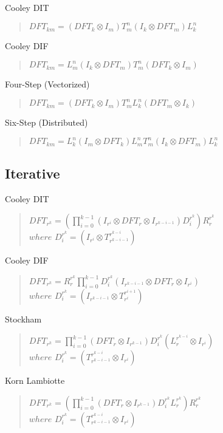 \documentclass[11pt]{article}
\begin{document}
Cooley DIT
\begin{quote}$DFT_{km} = (DFT_{k}\otimes I_{m})T^{n}_m(I_{k}\otimes DFT_{m})L^{n}_k$\end{quote}

Cooley DIF
\begin{quote}$DFT_{km} = L^{n}_m(I_{k}\otimes DFT_{m})T^{n}_m(DFT_{k}\otimes I_{m})$\end{quote}

Four-Step (Vectorized)
\begin{quote}$DFT_{km} = (DFT_{k}\otimes I_{m})T^{n}_mL^{n}_k(DFT_{m}\otimes I_{k})$\end{quote}

Six-Step (Distributed)
\begin{quote}$DFT_{km} = L^{n}_k(I_{m}\otimes DFT_{k})L^{n}_mT^{n}_m(I_{k}\otimes DFT_{m})L^{n}_k$\end{quote}

\subsection*{Iterative}

Cooley DIT
\begin{quote}$DFT_{r^{k}} = \left(\prod\limits^{k-1}_{i=0}(I_{r^{i}}\otimes DFT_r\otimes I_{r^{k-i-1}})D^{r^{k}}_{i}\right)R^{r^{k}}_{r}$\\
	$where$ $D^{r^{k}}_{i} = (I_{r^{i}}\otimes T^{r^{k-i}}_{r^{k-i-1}})$\end{quote}

Cooley DIF
\begin{quote}$DFT_{r^{k}} = R^{r^{k}}_{r}\prod\limits^{k-1}_{i=0}D^{r^{k}}_{i}(I_{r^{k-i-1}}\otimes DFT_r\otimes I_{r^{i}})$\\
	$where$ $D^{r^{k}}_{i} = (I_{r^{k-i-1}}\otimes T_{r^{i}}^{r^{i+1}})$\end{quote}

Stockham
\begin{quote}$DFT_{r^{k}} = \prod\limits^{k-1}_{i=0}(DFT_r\otimes I_{r^{k-1}})D^{r^{k}}_{i}(L^{r^{k-i}}_{r}\otimes I_{r^{i}})$\\
	$where$ $D^{r^{k}}_{i} = (T^{r^{k-i}}_{r^{k-i-1}}\otimes I_{r^{i}})$\end{quote}

Korn Lambiotte
\begin{quote}$DFT_{r^{k}} = \left(\prod\limits^{k-1}_{i=0}(DFT_r\otimes I_{r^{k-1}})D^{r^{k}}_{i}L^{r^{k}}_{r}\right)R^{r^{k}}_{r}$\\
	$where$ $D^{r^{k}}_{i} = (T^{r^{k-i}}_{r^{k-i-1}}\otimes I_{r^{i}})$\end{quote}
\end{document}
